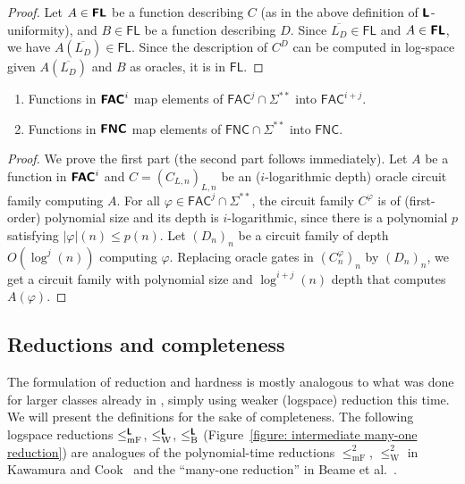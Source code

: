\documentclass[envcountsect,envcountsame,orivec,oribibl]{llncs}
\newcommand{\classonefont}[1]{\mathsf{#1}}
\newcommand{\classFL}{\classonefont{FL}}
\newcommand{\classFNC}{\classonefont{FNC}}
\newcommand{\classFAC}{\classonefont{FAC}}
\newcommand{\classtwofont}[1]{\text{\bfseries \sffamily \upshape #1}}
\newcommand{\classLtwo}{\classtwofont{L}}
\newcommand{\classFLtwo}{\classtwofont{FL}}
\newcommand{\classFNCtwo}{\classtwofont{FNC}}
\newcommand{\classFACtwo}{\classtwofont{FAC}}
\newcommand{\redW}{\leq _{\mathrm W}}
\newcommand{\redmF}{\leq _{\mathrm{mF}}}
\newcommand{\redB}{\leq _{\mathrm B}}
\newcommand{\redLW}{\redW ^{\classLtwo}}
\newcommand{\redLmF}{\redmF ^{\classLtwo}}
\newcommand{\redLB}{\redB ^{\classLtwo}}
\newcommand{\LM}{\varSigma ^{**}}
\begin{document}
\begin{proof}
 Let $A \in \classFLtwo$ be a function 
 describing $C$ (as in the above definition of $\classLtwo$-uniformity), 
 and 
 $B \in \classFL$ be a function 
 describing $D$.
 Since $\overline{L _D} \in \classFL$ and $A \in \classFLtwo$, 
 we have $A(\overline{L _D}) \in \classFL$. 
 Since the description of $C ^D$ can be computed in log-space
 given $A(\overline{L _D})$ and $B$ as oracles, 
 it is in $\classFL$. 
\end{proof}

\begin{lemma}
\label{lemma: type-one and type-two circuit classes}
\begin{enumerate}
 \item Functions in $\classFACtwo^i$ 
       map elements of $\classFAC^j \cap \LM$ 
       into $\classFAC^{i+j}$.
 \item Functions in $\classFNCtwo$
       map elements of $\classFNC \cap \LM$ 
       into $\classFNC$.
\end{enumerate}
\end{lemma}

\begin{proof}
We prove the first part (the second part follows immediately).
Let $A$ be a function in $\classFACtwo^i$ and $C = (C_{L,n})_{L,n}$ be an 
($i$-logarithmic depth) oracle circuit family computing $A$. 
For all $\varphi \in \classFAC^j \cap \LM$, 
the circuit family $C ^\varphi$ is 
of (first-order) polynomial size and its depth is $i$-logarithmic,
since there is a polynomial $p$ satisfying $|\varphi|(n) \le p(n)$.
Let $(D_n)_n$ be a circuit family of depth $O(\log^j(n))$
computing $\varphi$.
Replacing oracle gates in $(C^\varphi_n)_n$ by $(D_n)_n$, 
we get a circuit family with polynomial size and $\log^{i+j}(n)$ depth
that computes $A(\varphi)$.
\end{proof}

\subsection{Reductions and completeness}

The formulation of reduction and hardness 
is mostly analogous to what was done for larger classes 
already in \cite{kawamura2012complexity}, 
simply using weaker (logspace) reduction this time. 
We will present the definitions for the sake of completeness. 
The following logspace reductions $\redLmF$, $\redLW$, $\redLB$
(Figure~\ref{figure: intermediate many-one reduction}) are
analogues of the polynomial-time reductions 
$\redmF^2$, $\redW^2$ in Kawamura and Cook~\cite{kawamura2012complexity}
and the ``many-one reduction'' in Beame et al.~\cite{beame1995relative}. 
\end{document}
